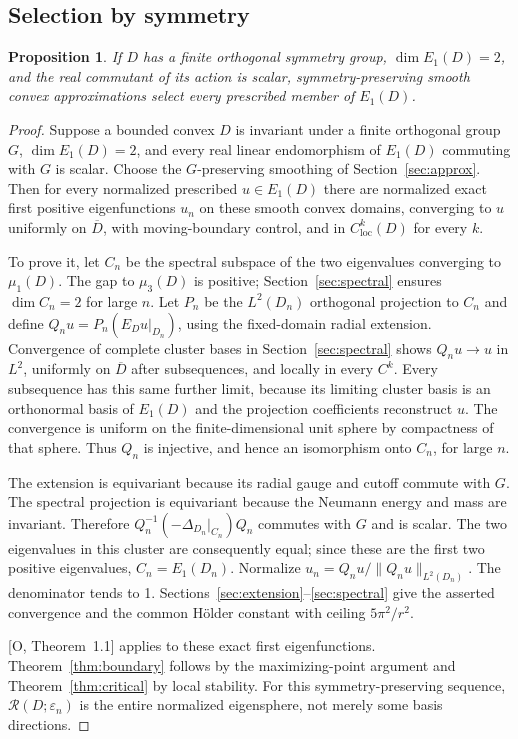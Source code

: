 \documentclass[11pt]{article}
\newtheorem{proposition}[theorem]{Proposition}
\theoremstyle{definition}
\theoremstyle{remark}
\numberwithin{equation}{section}
\begin{document}
\subsection{Selection by symmetry}\label{subsec:8.1}
\begin{proposition}\label{prop:symmetry-selection}
If $D$ has a finite orthogonal symmetry group, $\dim E_1(D)=2$, and the real commutant of its action is scalar, symmetry-preserving smooth convex approximations select every prescribed member of $E_1(D)$.
\end{proposition}
\begin{proof}

Suppose a bounded convex $D$ is invariant under a finite orthogonal group $G$, $\dim E_1(D)=2$, and every real linear endomorphism of $E_1(D)$ commuting with $G$ is scalar. Choose the $G$-preserving smoothing of Section~\ref{sec:approx}. Then for every normalized prescribed $u\in E_1(D)$ there are normalized exact first positive eigenfunctions $u_n$ on these smooth convex domains, converging to $u$ uniformly on $\overline D$, with moving-boundary control, and in $C^k_{\mathrm{loc}}(D)$ for every $k$.

To prove it, let $C_n$ be the spectral subspace of the two eigenvalues converging to $\mu_1(D)$. The gap to $\mu_3(D)$ is positive; Section~\ref{sec:spectral} ensures $\dim C_n=2$ for large $n$. Let $P_n$ be the $L^2(D_n)$ orthogonal projection to $C_n$ and define $Q_nu=P_n(E_Du|_{D_n})$, using the fixed-domain radial extension. Convergence of complete cluster bases in Section~\ref{sec:spectral} shows $Q_nu\to u$ in $L^2$, uniformly on $\overline D$ after subsequences, and locally in every $C^k$. Every subsequence has this same further limit, because its limiting cluster basis is an orthonormal basis of $E_1(D)$ and the projection coefficients reconstruct $u$. The convergence is uniform on the finite-dimensional unit sphere by compactness of that sphere. Thus $Q_n$ is injective, and hence an isomorphism onto $C_n$, for large $n$.

The extension is equivariant because its radial gauge and cutoff commute with $G$. The spectral projection is equivariant because the Neumann energy and mass are invariant. Therefore $Q_n^{-1}(-\Delta_{D_n}|_{C_n})Q_n$ commutes with $G$ and is scalar. The two eigenvalues in this cluster are consequently equal; since these are the first two positive eigenvalues, $C_n=E_1(D_n)$. Normalize $u_n=Q_nu/\|Q_nu\|_{L^2(D_n)}$. The denominator tends to 1. Sections~\ref{sec:extension}--\ref{sec:spectral} give the asserted convergence and the common H\"older constant with ceiling $5\pi^2/r^2$.

[O, Theorem~1.1] applies to these exact first eigenfunctions. Theorem~\ref{thm:boundary} follows by the maximizing-point argument and Theorem~\ref{thm:critical} by local stability. For this symmetry-preserving sequence, $\mathcal R(D;\varepsilon_n)$ is the entire normalized eigensphere, not merely some basis directions.

\end{proof}
\end{document}
